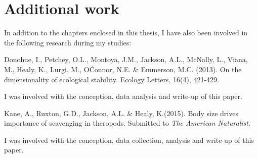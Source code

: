 \section{\uppercase{A}dditional work}
In addition to the chapters enclosed in this thesis, I have also been involved in the following research during my studies:\\

\begin{singlespace}
Donohue, I., Petchey, O.L., Montoya, J.M., Jackson, A.L., McNally, L., Viana, M., Healy, K., Lurgi, M., O\'Connor, N.E. \& Emmerson, M.C. (2013). On the dimensionality of ecological stability. Ecology Letters, 16(4), 421-429. \\
\end{singlespace}

\noindent
I was involved with the conception, data analysis and write-up of this paper. \\

\begin{singlespace}
Kane, A., Ruxton, G.D., Jackson, A.L. \& Healy, K.(2015). Body size drives importance of scavenging in theropods. Submitted to \textit{The American Naturalist}. \\
\end{singlespace}

\noindent
I was involved with the conception, data collection, analysis and write-up of this paper. \\



%
%

